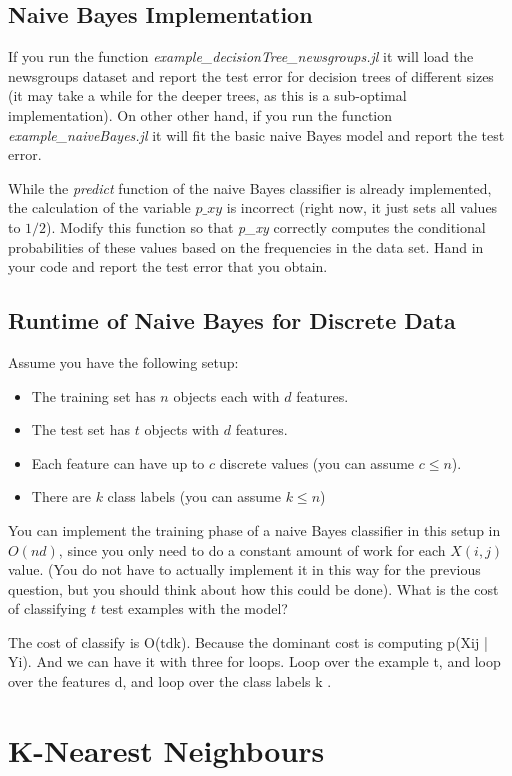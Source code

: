 \documentclass{article}
\def\blu#1{{\color{blu}#1}}
\def\items#1{\begin{itemize}#1\end{itemize}}
\begin{document}
\subsection{Naive Bayes Implementation}

If you run the function \emph{example\_decisionTree\_newsgroups.jl} it will load the newsgroups dataset and report the test error for decision trees of different sizes (it may take a while for the deeper trees, as this is a sub-optimal implementation). On other other hand, if you run the function \emph{example\_naiveBayes.jl} it will fit the basic naive Bayes model and report the test error.

While the \emph{predict} function of the naive Bayes classifier is already implemented, the calculation of the variable $p\_xy$ is incorrect (right now, it just sets all values to $1/2$). \blu{Modify this function so that \emph{p\_xy} correctly computes the conditional probabilities of these values based on the frequencies in the data set. Hand in your code and report the test error that you obtain.}




\subsection{Runtime of Naive Bayes for Discrete Data}

Assume you have the following setup:
\items{
\item The training set has $n$ objects each with $d$ features.
\item The test set has $t$ objects with $d$ features.
\item Each feature can have up to $c$ discrete values (you can assume $c \leq n$).
\item There are $k$ class labels (you can assume $k \leq n$)
}
You can implement the training phase of a naive Bayes classifier in this setup in $O(nd)$, since you only need to do a constant amount of work for each $X(i,j)$ value. (You do not have to actually implement it in this way for the previous question, but you should think about how this could be done). \blu{What is the cost of classifying $t$ test examples with the model?}

The cost of classify is O(tdk). Because the dominant cost is computing p(Xij | Yi). And we can have it with three for loops. Loop over the example t, and loop over the features d, and loop over the class labels k .


\section{K-Nearest Neighbours}
\end{document}
